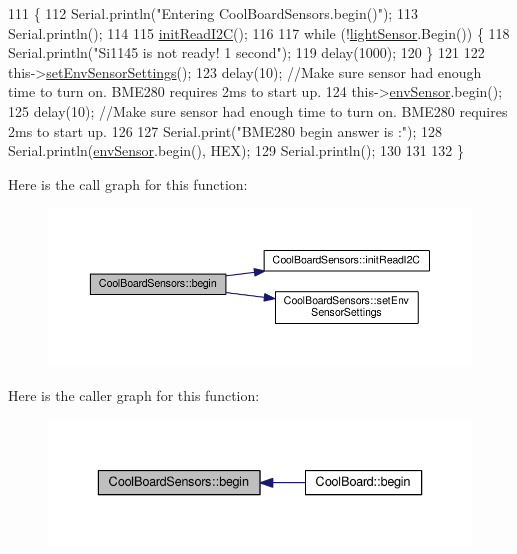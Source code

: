 \begin{DoxyCode}
111 \{       
112     Serial.println(\textcolor{stringliteral}{"Entering CoolBoardSensors.begin()"});
113     Serial.println();
114 
115     \hyperlink{classCoolBoardSensors_acad6a8418c66d36868caca23c844ecb6}{initReadI2C}();
116 
117     \textcolor{keywordflow}{while} (!\hyperlink{classCoolBoardSensors_a3e397300fb707dd193e909a757bf6102}{lightSensor}.Begin()) \{
118       Serial.println(\textcolor{stringliteral}{"Si1145 is not ready!  1 second"});
119       delay(1000);
120     \}
121      
122     this->\hyperlink{classCoolBoardSensors_a406307ffd70272282d91479c7ed8d66f}{setEnvSensorSettings}();
123     delay(10);  \textcolor{comment}{//Make sure sensor had enough time to turn on. BME280 requires 2ms to start up.}
124     this->\hyperlink{classCoolBoardSensors_a868e38985e9a2412829fa2790ca13e2e}{envSensor}.begin();
125     delay(10);  \textcolor{comment}{//Make sure sensor had enough time to turn on. BME280 requires 2ms to start up.}
126     
127     Serial.print(\textcolor{stringliteral}{"BME280 begin answer is :"});
128     Serial.println(\hyperlink{classCoolBoardSensors_a868e38985e9a2412829fa2790ca13e2e}{envSensor}.begin(), HEX);
129     Serial.println();
130 
131 
132 \}
\end{DoxyCode}
Here is the call graph for this function\+:\nopagebreak
\begin{figure}[H]
\begin{center}
\leavevmode
\includegraphics[width=350pt]{classCoolBoardSensors_a97095823ef7c8f5290812f1405b966b3_cgraph}
\end{center}
\end{figure}
Here is the caller graph for this function\+:\nopagebreak
\begin{figure}[H]
\begin{center}
\leavevmode
\includegraphics[width=336pt]{classCoolBoardSensors_a97095823ef7c8f5290812f1405b966b3_icgraph}
\end{center}
\end{figure}
\mbox{\label{classCoolBoardSensors_a9a218895c5423375c33c08f2c56fb23a}} 
